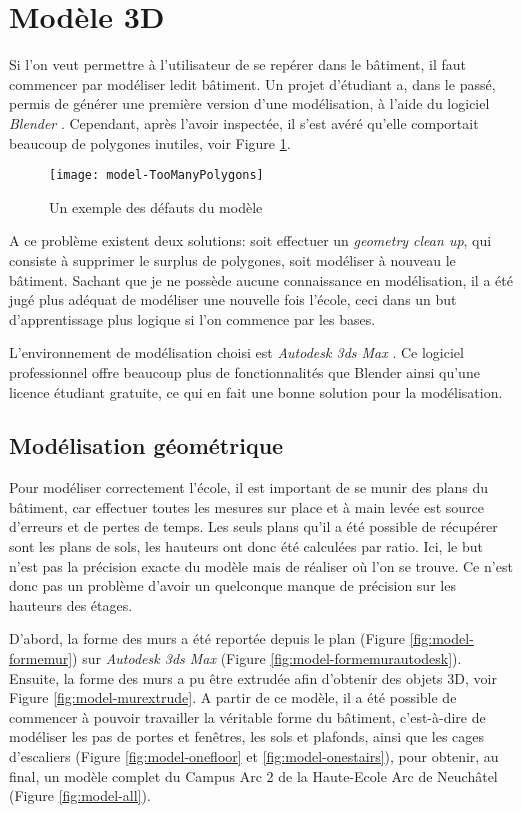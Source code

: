 \section{Modèle 3D}
Si l'on veut permettre à l'utilisateur de se repérer dans le bâtiment, il faut commencer par modéliser ledit bâtiment. Un projet d'étudiant a, dans le passé, permis de générer une première version d'une modélisation, à l'aide du logiciel \emph{Blender} \cite{blender-website}. Cependant, après l'avoir inspectée, il s'est avéré qu'elle comportait beaucoup de polygones inutiles, voir Figure \ref{fig:model-toomanypolygons}.

\begin{figure}[h!]
	\centering
	\texttt{[image: model-TooManyPolygons]}
	\caption{Un exemple des défauts du modèle}
	\label{fig:model-toomanypolygons}
\end{figure}

A ce problème existent deux solutions: soit effectuer un \textit{geometry clean up}, qui consiste à supprimer le surplus de polygones, soit modéliser à nouveau le bâtiment. Sachant que je ne possède aucune connaissance en modélisation, il a été jugé plus adéquat de modéliser une nouvelle fois l'école, ceci dans un but d'apprentissage plus logique si l'on commence par les bases.

L'environnement de modélisation choisi est \emph{Autodesk 3ds Max} \cite{autodesk-3dsmax}. Ce logiciel professionnel offre beaucoup plus de fonctionnalités que Blender ainsi qu'une licence étudiant gratuite, ce qui en fait une bonne solution pour la modélisation.


\subsection{Modélisation géométrique}
Pour modéliser correctement l'école, il est important de se munir des plans du bâtiment, car effectuer toutes les mesures sur place et à main levée est source d'erreurs et de pertes de temps. Les seuls plans qu'il a été possible de récupérer sont les plans de sols, les hauteurs ont donc été calculées par ratio. Ici, le but n'est pas la précision exacte du modèle mais de réaliser où l'on se trouve. Ce n'est donc pas un problème d'avoir un quelconque manque de précision sur les hauteurs des étages.

D'abord, la forme des murs a été reportée depuis le plan (Figure \ref{fig:model-formemur}) sur \textit{Autodesk 3ds Max} (Figure \ref{fig:model-formemurautodesk}). Ensuite, la forme des murs a pu être extrudée afin d'obtenir des objets 3D, voir Figure \ref{fig:model-murextrude}. A partir de ce modèle, il a été possible de commencer à pouvoir travailler la véritable forme du bâtiment, c'est-à-dire de modéliser les pas de portes et fenêtres, les sols et plafonds, ainsi que les cages d'escaliers (Figure \ref{fig:model-onefloor} et \ref{fig:model-onestairs}), pour obtenir, au final, un modèle complet du Campus Arc 2 de la Haute-Ecole Arc de Neuchâtel (Figure \ref{fig:model-all}).

